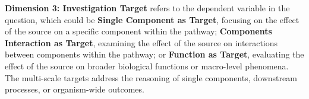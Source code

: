 

\textbf{Dimension 3: Investigation Target} refers to the dependent variable in the question, which could be \textbf{Single Component as Target}, focusing on the effect of the source on a specific component within the pathway; \textbf{Components Interaction as Target}, examining the effect of the source on interactions between components within the pathway; or \textbf{Function as Target}, evaluating the effect of the source on broader biological functions or macro-level phenomena. The multi-scale targets address the reasoning of single components, downstream processes, or organism-wide outcomes.











